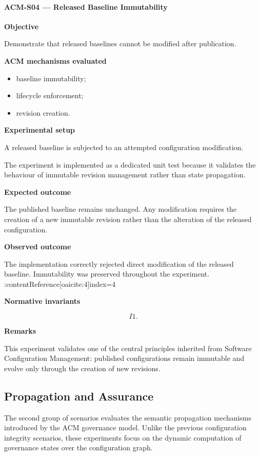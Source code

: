 \documentclass[10pt]{article}
\begin{document}
\paragraph{ACM-S04 --- Released Baseline Immutability}

\textbf{Objective}

Demonstrate that released baselines cannot be modified after publication.

\textbf{ACM mechanisms evaluated}

\begin{itemize}
\item baseline immutability;
\item lifecycle enforcement;
\item revision creation.
\end{itemize}

\textbf{Experimental setup}

A released baseline is subjected to an attempted configuration modification.

The experiment is implemented as a dedicated unit test because it validates the
behaviour of immutable revision management rather than state propagation.

\textbf{Expected outcome}

The published baseline remains unchanged.
Any modification requires the creation of a new immutable revision rather than
the alteration of the released configuration.

\textbf{Observed outcome}

The implementation correctly rejected direct modification of the released
baseline.
Immutability was preserved throughout the experiment. :contentReference[oaicite:4]{index=4}

\textbf{Normative invariants}

\[
I1.
\]

\textbf{Remarks}

This experiment validates one of the central principles inherited from Software
Configuration Management: published configurations remain immutable and evolve
only through the creation of new revisions.
\subsection{Propagation and Assurance}
\label{app:scenario_group_b}

The second group of scenarios evaluates the semantic propagation mechanisms
introduced by the ACM governance model. Unlike the previous configuration
integrity scenarios, these experiments focus on the dynamic computation of
governance states over the configuration graph.
\end{document}
